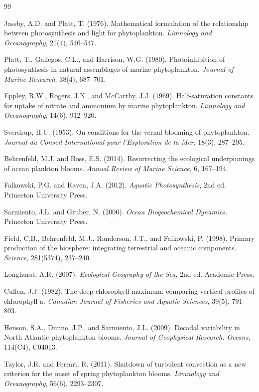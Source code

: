 \documentclass[a4paper, 11pt]{article}
\begin{document}
\begin{thebibliography}{99}

Jassby, A.D. and Platt, T. (1976).
Mathematical formulation of the relationship between photosynthesis and light for phytoplankton.
\textit{Limnology and Oceanography}, 21(4), 540--547.

Platt, T., Gallegos, C.L., and Harrison, W.G. (1980).
Photoinhibition of photosynthesis in natural assemblages of marine phytoplankton.
\textit{Journal of Marine Research}, 38(4), 687--701.

Eppley, R.W., Rogers, J.N., and McCarthy, J.J. (1969).
Half-saturation constants for uptake of nitrate and ammonium by marine phytoplankton.
\textit{Limnology and Oceanography}, 14(6), 912--920.

Sverdrup, H.U. (1953).
On conditions for the vernal blooming of phytoplankton.
\textit{Journal du Conseil International pour l'Exploration de la Mer}, 18(3), 287--295.

Behrenfeld, M.J. and Boss, E.S. (2014).
Resurrecting the ecological underpinnings of ocean plankton blooms.
\textit{Annual Review of Marine Science}, 6, 167--194.

Falkowski, P.G. and Raven, J.A. (2012).
\textit{Aquatic Photosynthesis}, 2nd ed.
Princeton University Press.

Sarmiento, J.L. and Gruber, N. (2006).
\textit{Ocean Biogeochemical Dynamics}.
Princeton University Press.

Field, C.B., Behrenfeld, M.J., Randerson, J.T., and Falkowski, P. (1998).
Primary production of the biosphere: integrating terrestrial and oceanic components.
\textit{Science}, 281(5374), 237--240.

Longhurst, A.R. (2007).
\textit{Ecological Geography of the Sea}, 2nd ed.
Academic Press.

Cullen, J.J. (1982).
The deep chlorophyll maximum: comparing vertical profiles of chlorophyll a.
\textit{Canadian Journal of Fisheries and Aquatic Sciences}, 39(5), 791--803.

Henson, S.A., Dunne, J.P., and Sarmiento, J.L. (2009).
Decadal variability in North Atlantic phytoplankton blooms.
\textit{Journal of Geophysical Research: Oceans}, 114(C4), C04013.

Taylor, J.R. and Ferrari, R. (2011).
Shutdown of turbulent convection as a new criterion for the onset of spring phytoplankton blooms.
\textit{Limnology and Oceanography}, 56(6), 2293--2307.


\end{thebibliography}
\end{document}
